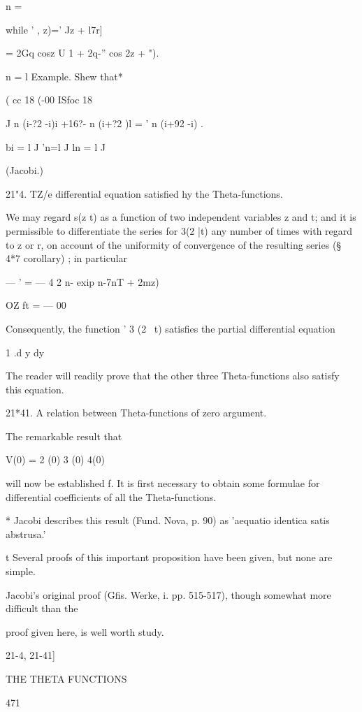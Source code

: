 n = \

while ' , z)=' Jz + l7r]

= 2Gq cosz U 1 + 2q-'' cos 2z + ").

n = l Example. Shew that*

( cc 18 (-00 ISfoc 18

J n (i-?2 -i)i +16?- n (i+?2 )l = ' n (i+92 -i) .

bi = l J 'n=l J ln = l J

(Jacobi.)

21"4. TZ/e differential equation satisfied hy the Theta-functions.

We may regard s(z t) as a function of two independent variables z and
t; and it is permissible to differentiate the series for 3(2 |t) any
number of times with regard to z or r, on account of the uniformity of
convergence of the resulting series (§ 4*7 corollary) ; in particular

— ' = — 4 2 n- exip n-7nT + 2mz)

OZ ft = — 00

Consequently, the function ' 3 (2 \ t) satisfies the partial
differential equation

1 .d y dy

The reader will readily prove that the other three Theta-functions
also satisfy this equation.

21*41. A relation between Theta-functions of zero argument.

The remarkable result that

V(0) = 2 (0) 3 (0) 4(0)

will now be established f. It is first necessary to obtain some
formulae for differential coefficients of all the Theta-functions.

* Jacobi describes this result (Fund. Nova, p. 90) as 'aequatio
identica satis abstrusa.'

t Several proofs of this important proposition have been given, but
none are simple.

Jacobi's original proof (Gfis. Werke, i. pp. 515-517), though somewhat
more difficult than the

proof given here, is well worth study.



21-4, 21-41]



THE THETA FUNCTIONS



471



